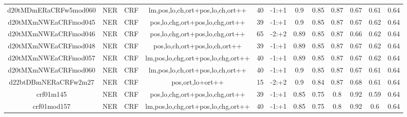 \documentclass[a4paper]{article}
\begin{document}
\begin{landscape}
\begin{center}
\begin{tabular}{ |c|c|c|c|c|c|c|c|c|c|c|c|}
 
 	
 	\small{ d20tMDmERaCRFw5mod060 } & \small{ NER} & \small{  CRF }  & lm,pos,lo,ch,ort+pos,lo,ch,ort++  &  40 &  \small{  -1:+1 }  &  0.9 & 0.85 & 0.87  &  0.67 & 0.61 & 0.64 \\
 	

 
 	
 	\small{ d20tMXmNWEaCRFmod045 } & \small{ NER} & \small{  CRF }  & pos,lo,chg,ort+pos,lo,chg,ort++  &  39 &  \small{  -1:+1 }  &  0.9 & 0.85 & 0.87  &  0.67 & 0.62 & 0.64 \\
 	

 
 	
 	\small{ d20tMXmNWEaCRFmod046 } & \small{ NER} & \small{  CRF }  & pos,lo,chg,ort+pos,lo,chg,ort++  &  65 &  \small{  -2:+2 }  &  0.89 & 0.85 & 0.87  &  0.66 & 0.62 & 0.64 \\
 	

 
 	
 	\small{ d20tMXmNWEaCRFmod048 } & \small{ NER} & \small{  CRF }  & pos,lo,ch,ort+pos,lo,ch,ort++  &  39 &  \small{  -1:+1 }  &  0.89 & 0.85 & 0.87  &  0.67 & 0.62 & 0.64 \\
 	

 
 	
 	\small{ d20tMXmNWEaCRFmod057 } & \small{ NER} & \small{  CRF }  & lm,pos,lo,chg,ort+pos,lo,chg,ort++  &  40 &  \small{  -1:+1 }  &  0.89 & 0.85 & 0.87  &  0.67 & 0.62 & 0.64 \\
 	

 
 	
 	\small{ d20tMXmNWEaCRFmod060 } & \small{ NER} & \small{  CRF }  & lm,pos,lo,ch,ort+pos,lo,ch,ort++  &  40 &  \small{  -1:+1 }  &  0.9 & 0.85 & 0.87  &  0.67 & 0.61 & 0.64 \\
 	

 
 	
 	\small{ d22btDBmNERaCRFw2m27 } & \small{ NER} & \small{  CRF }  & pos,ort,lo+ort++  &  15 &  \small{  -2:+2 }  &  0.9 & 0.84 & 0.87  &  0.68 & 0.61 & 0.64 \\
 	

 
 	
 	\small{ crf01m145 } & \small{ NER} & \small{  CRF }  & pos,lo,chg,ort+pos,lo,chg,ort++  &  39 &  \small{  -1:+1 }  &  0.85 & 0.75 & 0.8  &  0.92 & 0.59 & 0.64 \\
 	

 
 	
 	\small{ crf01mod157 } & \small{ NER} & \small{  CRF }  & lm,pos,lo,chg,ort+pos,lo,chg,ort++  &  40 &  \small{  -1:+1 }  &  0.85 & 0.75 & 0.8  &  0.92 & 0.6 & 0.64 \\
 	


\end{tabular}
\end{center}
\end{landscape}
\end{document}
